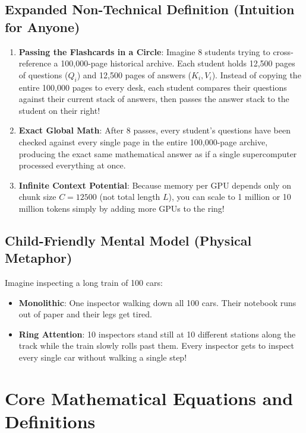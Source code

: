 \documentclass[11pt,a4paper]{article}
\theoremstyle{definition}
\begin{document}
\subsection{Expanded Non-Technical Definition (Intuition for Anyone)}
\begin{enumerate}
    \item \textbf{Passing the Flashcards in a Circle}: Imagine 8 students trying to cross-reference a 100,000-page historical archive. Each student holds 12,500 pages of questions ($Q_i$) and 12,500 pages of answers ($K_i, V_i$). Instead of copying the entire 100,000 pages to every desk, each student compares their questions against their current stack of answers, then passes the answer stack to the student on their right!
    \item \textbf{Exact Global Math}: After 8 passes, every student's questions have been checked against every single page in the entire 100,000-page archive, producing the exact same mathematical answer as if a single supercomputer processed everything at once.
    \item \textbf{Infinite Context Potential}: Because memory per GPU depends only on chunk size $C = 12500$ (not total length $L$), you can scale to 1 million or 10 million tokens simply by adding more GPUs to the ring!
\end{enumerate}

\subsection{Child-Friendly Mental Model (Physical Metaphor)}
Imagine inspecting a long train of 100 cars:
\begin{itemize}
    \item \textbf{Monolithic}: One inspector walking down all 100 cars. Their notebook runs out of paper and their legs get tired.
    \item \textbf{Ring Attention}: 10 inspectors stand still at 10 different stations along the track while the train slowly rolls past them. Every inspector gets to inspect every single car without walking a single step!
\end{itemize}

\section{Core Mathematical Equations and Definitions}
\end{document}
